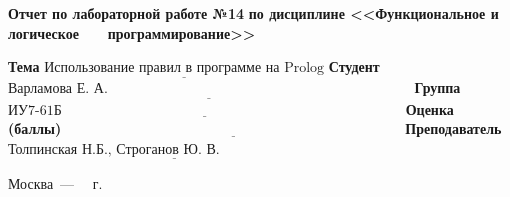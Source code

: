 \documentclass[12pt]{report}
\begin{document}
\begin{titlepage}
		\begin{center}
			\noindent\begin{minipage}{1.1\textwidth}\centering
				\Large\textbf{Отчет по лабораторной работе №14}\newline
				\textbf{по дисциплине <<Функциональное и логическое}\newline
				\textbf{~~~программирование>>}\newline\newline
			\end{minipage}
		\end{center}
		
		\noindent\textbf{Тема} $\underline{\text{Использование правил в программе на Prolog}}$\newline\newline
		\noindent\textbf{Студент} $\underline{\text{Варламова Е. А.~~~~~~~~~~~~~~~~~~~~~~~~~~~~~~~~~~~~~~~~~~~~~~~~~~~~~~~~~~~~~~~~~}}$\newline\newline
		\noindent\textbf{Группа} $\underline{\text{ИУ7-61Б~~~~~~~~~~~~~~~~~~~~~~~~~~~~~~~~~~~~~~~~~~~~~~~~~~~~~~~~~~~~~~~~~~~~~~~~~}}$\newline\newline
		\noindent\textbf{Оценка (баллы)} $\underline{\text{~~~~~~~~~~~~~~~~~~~~~~~~~~~~~~~~~~~~~~~~~~~~~~~~~~~~~~~~~~~~~~~~~~~~~~~~}}$\newline\newline
		\noindent\textbf{Преподаватель} $\underline{\text{Толпинская Н.Б., Строганов Ю. В.~~~~~~~~~~~~~~~~~~~~~~~~~~}}$\newline\newline\newline
		
		\begin{center}
			\vfill
			Москва~---~\the\year
			~г.
		\end{center}
	\end{titlepage}
\end{document}

